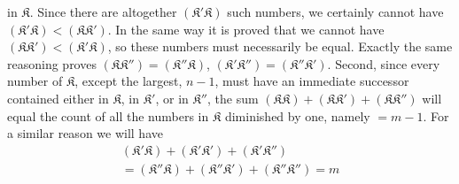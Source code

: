 in \(\mathfrak K\). Since there are altogether \((\mathfrak K'\mathfrak K)\) such numbers, we certainly cannot have \((\mathfrak K'\mathfrak K)<(\mathfrak K\mathfrak K')\). In the same way it is proved that we cannot have \((\mathfrak K\mathfrak K')<(\mathfrak K'\mathfrak K)\), so these numbers must necessarily be equal. Exactly the same reasoning proves \((\mathfrak K\mathfrak K'')=(\mathfrak K''\mathfrak K)\), \((\mathfrak K'\mathfrak K'')=(\mathfrak K''\mathfrak K')\). Second, since every number of \(\mathfrak K\), except the largest, \(n-1\), must have an immediate successor contained either in \(\mathfrak K\), in \(\mathfrak K'\), or in \(\mathfrak K''\), the sum \((\mathfrak K\mathfrak K)+(\mathfrak K\mathfrak K')+(\mathfrak K\mathfrak K'')\) will equal the count of all the numbers in \(\mathfrak K\) diminished by one, namely \(=m-1\). For a similar reason we will have \[\begin{aligned}(\mathfrak K'\mathfrak K)+(\mathfrak K'\mathfrak K')+(\mathfrak K'\mathfrak K'')\\{}=(\mathfrak K''\mathfrak K)+(\mathfrak K''\mathfrak K')+(\mathfrak K''\mathfrak K'')=m\end{aligned}\]

